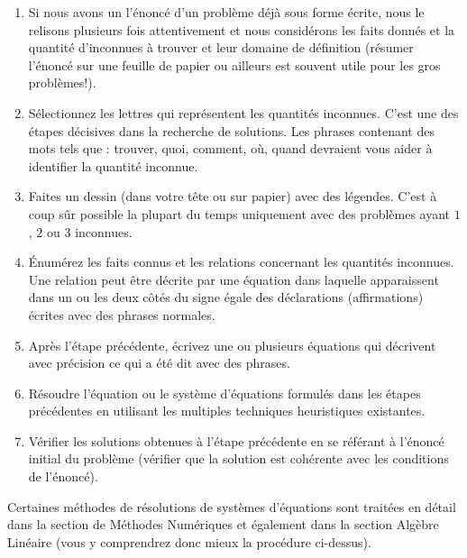 	\begin{enumerate}
		\item Si nous avons un l'énoncé d'un problème déjà sous forme écrite, nous le relisons plusieurs fois attentivement et nous considérons les faits donnés et la quantité d'inconnues à trouver et leur domaine de définition (résumer l'énoncé sur une feuille de papier ou ailleurs est souvent utile pour les gros problèmes!).
		
		\item Sélectionnez les lettres qui représentent les quantités inconnues. C'est une des étapes décisives dans la recherche de solutions. Les phrases contenant des mots tels que : trouver, quoi, comment, où, quand devraient vous aider à identifier la quantité inconnue.
		
		\item Faites un dessin (dans votre tête ou sur papier) avec des légendes. C'est à coup sûr possible la plupart du temps uniquement avec des problèmes ayant $1$, $2$ ou $3$ inconnues.
		
		\item Énumérez les faits connus et les relations concernant les quantités inconnues. Une relation peut être décrite par une équation dans laquelle apparaissent dans un ou les deux côtés du signe égale des déclarations (affirmations) écrites avec des phrases normales.
		
		\item Après l'étape précédente, écrivez une ou plusieurs équations qui décrivent avec précision ce qui a été dit avec des phrases.
		
		\item Résoudre l'équation ou le système d'équations formulés dans les étapes précédentes en utilisant les multiples techniques heuristiques existantes.
		
		\item Vérifier les solutions obtenues à l'étape précédente en se référant à l'énoncé initial du problème (vérifier que la solution est cohérente avec les conditions de l'énoncé).
	\end{enumerate}
	Certaines méthodes de résolutions de systèmes d'équations sont traitées en détail dans la section de Méthodes Numériques et également dans la section Algèbre Linéaire (vous y comprendrez donc mieux la procédure ci-dessus).
	 
